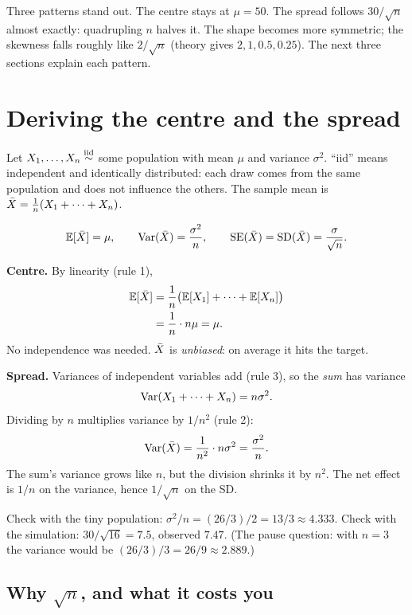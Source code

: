 Three patterns stand out. The centre stays at $\mu=50$. The spread follows
$30/\sqrt n$ almost exactly: quadrupling $n$ halves it. The shape becomes more
symmetric; the skewness falls roughly like $2/\sqrt n$ (theory gives
$2,1,0.5,0.25$). The next three sections explain each pattern.

\section{Deriving the centre and the spread}
\label{sec:sd-derive}

Let $X_1,\dots,X_n\overset{\text{iid}}{\sim}$ some population with mean $\mu$ and variance $\sigma^2$.
``iid'' means independent and identically distributed: each draw comes from the
same population and does not influence the others. The sample mean is
$\bar{X}=\frac1n(X_1+\dots+X_n)$.

\begin{theorem}
\label{thm:sd-xbar}
\[
\operatorname{\mathbb{E}}[\bar{X}]=\mu,\qquad \operatorname{Var}(\bar{X})=\frac{\sigma^2}{n},\qquad
\operatorname{SE}(\bar{X})=\operatorname{SD}(\bar{X})=\frac{\sigma}{\sqrt n}.
\]
\end{theorem}

\begin{whybox}
\textbf{Centre.} By linearity (rule 1),
\begin{align*}
\operatorname{\mathbb{E}}[\bar{X}] &= \frac1n\bigl(\operatorname{\mathbb{E}}[X_1]+\dots+\operatorname{\mathbb{E}}[X_n]\bigr) \\
&= \frac1n\cdot n\mu = \mu.
\end{align*}
No independence was needed. $\bar{X}$ is \emph{unbiased}: on average it hits the
target.

\textbf{Spread.} Variances of independent variables add (rule 3), so the
\emph{sum} has variance
\[
\operatorname{Var}(X_1+\dots+X_n)=n\sigma^2 .
\]
Dividing by $n$ multiplies variance by $1/n^2$ (rule 2):
\[
\operatorname{Var}(\bar{X})=\frac{1}{n^2}\cdot n\sigma^2=\frac{\sigma^2}{n}.
\]
The sum's variance grows like $n$, but the division shrinks it by $n^2$. The net
effect is $1/n$ on the variance, hence $1/\sqrt n$ on the SD.
\end{whybox}

Check with the tiny population: $\sigma^2/n=(26/3)/2=13/3\approx 4.333$. Check with
the simulation: $30/\sqrt{16}=7.5$, observed $7.47$. (The pause question: with
$n=3$ the variance would be $(26/3)/3=26/9\approx 2.889$.)

\subsection{Why $\sqrt n$, and what it costs you}


